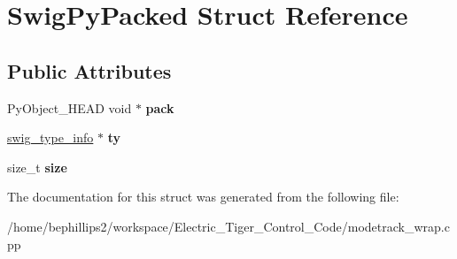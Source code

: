 \hypertarget{struct_swig_py_packed}{\section{Swig\-Py\-Packed Struct Reference}
\label{struct_swig_py_packed}
}
\subsection*{Public Attributes}
\begin{DoxyCompactItemize}
\item 
\hypertarget{struct_swig_py_packed_af5122bcb9e73bf2dec4ce5f58f004e1b}{Py\-Object\-\_\-\-H\-E\-A\-D void $\ast$ {\bfseries pack}}\label{struct_swig_py_packed_af5122bcb9e73bf2dec4ce5f58f004e1b}

\item 
\hypertarget{struct_swig_py_packed_aa6f6be0a8a1bff7710200fbe8d51acf0}{\hyperlink{structswig__type__info}{swig\-\_\-type\-\_\-info} $\ast$ {\bfseries ty}}\label{struct_swig_py_packed_aa6f6be0a8a1bff7710200fbe8d51acf0}

\item 
\hypertarget{struct_swig_py_packed_aed2bfb8fb3c9f804c386215db63921cb}{size\-\_\-t {\bfseries size}}\label{struct_swig_py_packed_aed2bfb8fb3c9f804c386215db63921cb}

\end{DoxyCompactItemize}


The documentation for this struct was generated from the following file\-:\begin{DoxyCompactItemize}
\item 
/home/bephillips2/workspace/\-Electric\-\_\-\-Tiger\-\_\-\-Control\-\_\-\-Code/modetrack\-\_\-wrap.\-cpp\end{DoxyCompactItemize}
